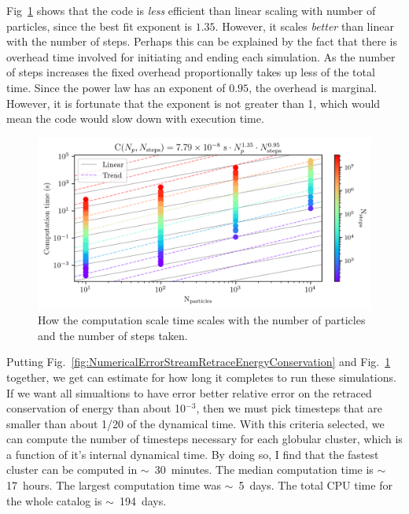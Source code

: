         Fig~\ref{fig:NumericalErrorComputationTimeScalingForStreams} shows that the code is \textit{less} efficient than linear scaling with number of particles, since the best fit exponent is $1.35$. However, it scales \textit{better} than linear with the number of steps. Perhaps this can be explained by the fact that there is overhead time involved for initiating and ending each simulation. As the number of steps increases the fixed overhead proportionally takes up less of the total time. Since the power law has an exponent of $0.95$, the overhead is marginal. However, it is fortunate that the exponent is not greater than 1, which would mean the code would slow down with execution time. 
        \begin{figure}
            \centering
            \includegraphics[width=\linewidth]{images/NumericalErrorComputationTimeScalingForStreams.png}
            \caption{How the computation scale time scales with the number of particles and the number of steps taken.}
            \label{fig:NumericalErrorComputationTimeScalingForStreams}
        \end{figure}
        Putting Fig.~\ref{fig:NumericalErrorStreamRetraceEnergyConservation} and Fig.~\ref{fig:NumericalErrorComputationTimeScalingForStreams} together, we get can estimate for how long it completes to run these simulations. If we want all simualtions to have error better relative error on the retraced conservation of energy than about 10$^{-3}$, then we must pick timesteps that are smaller than about 1/20 of the dynamical time. With this criteria selected, we can compute the number of timesteps necessary for each globular cluster, which is a function of it's internal dynamical time. By doing so, I find that the fastest cluster can be computed in $\sim$~30~minutes. The median computation time is $\sim$17~hours. The largest computation time was $\sim$~5~days. The total CPU time for the whole catalog is $\sim$~194~days. 

